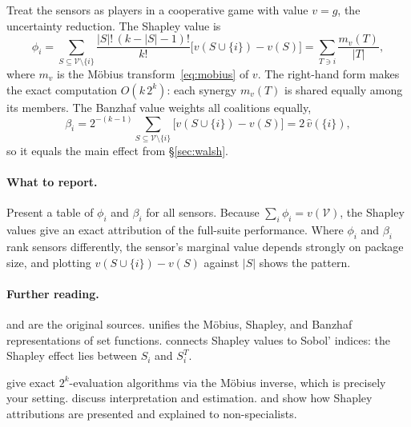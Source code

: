 \documentclass[11pt]{article}
\newcommand{\V}{\mathcal{V}}
\begin{document}
Treat the sensors as players in a cooperative game with value $v=g$, the uncertainty reduction.
The Shapley value \parencite{Shapley1953} is
\begin{equation}
  \phi_i=\sum_{S\subseteq\V\setminus\{i\}}\frac{|S|!\,(k-|S|-1)!}{k!}\bigl[v(S\cup\{i\})-v(S)\bigr]
        =\sum_{T\ni i}\frac{m_v(T)}{|T|},
\end{equation}
where $m_v$ is the M\"obius transform~\eqref{eq:mobius} of $v$.
The right-hand form makes the exact computation $O(k\,2^k)$: each synergy $m_v(T)$ is shared equally among its members.
The Banzhaf value \parencite{Banzhaf1965} weights all coalitions equally,
\begin{equation}
  \beta_i=2^{-(k-1)}\sum_{S\subseteq\V\setminus\{i\}}\bigl[v(S\cup\{i\})-v(S)\bigr]=2\,\widehat{v}(\{i\}),
\end{equation}
so it equals the main effect from \S\ref{sec:walsh}.

\paragraph{What to report.}
Present a table of $\phi_i$ and $\beta_i$ for all sensors.
Because $\sum_i\phi_i=v(\V)$, the Shapley values give an exact attribution of the full-suite performance.
Where $\phi_i$ and $\beta_i$ rank sensors differently, the sensor's marginal value depends strongly on package size, and plotting $v(S\cup\{i\})-v(S)$ against $|S|$ shows the pattern.

\paragraph{Further reading.}
\begin{reading}
  \item[Mathematics.] \textcite{Shapley1953} and \textcite{Banzhaf1965} are the original sources.
        \textcite{Grabisch2016} unifies the M\"obius, Shapley, and Banzhaf representations of set functions.
        \textcite{Owen2014} connects Shapley values to Sobol' indices: the Shapley effect lies between $S_i$ and $S_i^T$.
  \item[Applying it.] \textcite{Plischke2021} give exact $2^k$-evaluation algorithms via the M\"obius inverse, which is precisely your setting.
        \textcite{Song2016} discuss interpretation and estimation.
        \textcite{LundbergLee2017} and \textcite{Molnar2022} show how Shapley attributions are presented and explained to non-specialists.
\end{reading}
\end{document}
